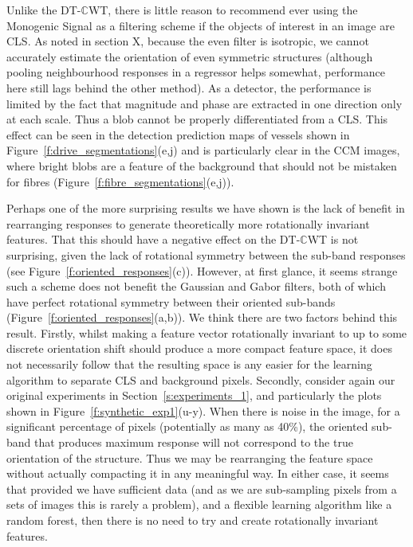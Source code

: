 \documentclass{IEEEtran}
\newcommand{\fref}[1]{Figure~\ref{#1}}
\newcommand{\sref}[1]{Section~\ref{#1}}
\def\dtcwt{DT-$\mathbb{C}$WT}
\begin{document}
Unlike the \dtcwt{}, there is little reason to recommend ever using the Monogenic Signal as a filtering scheme if the objects of interest in an image are CLS. As noted in section X, because the even filter is isotropic, we cannot accurately estimate the orientation of even symmetric structures (although pooling neighbourhood responses in a regressor helps somewhat, performance here still lags behind the other method). As a detector, the performance is limited by the fact that magnitude and phase are extracted in one direction only at each scale. Thus a blob cannot be properly differentiated from a CLS. This effect can be seen in the detection prediction maps of vessels shown in \fref{f:drive_segmentations}(e,j) and is particularly clear in the CCM images, where bright blobs are a feature of the background that should not be mistaken for fibres (\fref{f:fibre_segmentations}(e,j)).

Perhaps one of the more surprising results we have shown is the lack of benefit in rearranging responses to generate theoretically more rotationally invariant features. That this should have a negative effect on the \dtcwt{} is not surprising, given the lack of rotational symmetry between the sub-band responses (see \fref{f:oriented_responses}(c)). However, at first glance, it seems strange such a scheme does not benefit the Gaussian and Gabor filters, both of which have perfect rotational symmetry between their oriented sub-bands (\fref{f:oriented_responses}(a,b)). We think there are two factors behind this result. Firstly, whilst making a feature vector rotationally invariant to up to some discrete orientation shift should produce a more compact feature space, it does not necessarily follow that the resulting space is any easier for the learning algorithm to separate CLS and background pixels. Secondly, consider again our original experiments in \sref{s:experiments_1}, and particularly the plots shown in \fref{f:synthetic_exp1}(u-y). When there is noise in the image, for a significant percentage of pixels (potentially as many as 40\%), the oriented sub-band that produces maximum response will not correspond to the true orientation of the structure. Thus we may be rearranging the feature space without actually compacting it in any meaningful way. In either case, it seems that provided we have sufficient data (and as we are sub-sampling pixels from a sets of images this is rarely a problem), and a flexible learning algorithm like a random forest, then there is no need to try and create rotationally invariant features.
\end{document}
